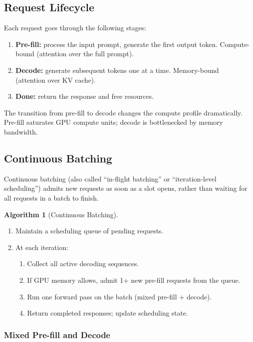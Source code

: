 \documentclass[11pt,a4paper]{article}
\theoremstyle{definition}
\newtheorem{algorithm}{Algorithm}[section]
\begin{document}
\subsection{Request Lifecycle}

Each request goes through the following stages:

\begin{enumerate}
	\item \textbf{Pre-fill:} process the input prompt, generate the first output token. Compute-bound (attention over the full prompt).
	\item \textbf{Decode:} generate subsequent tokens one at a time. Memory-bound (attention over KV cache).
	\item \textbf{Done:} return the response and free resources.
\end{enumerate}

The transition from pre-fill to decode changes the compute profile dramatically. Pre-fill saturates GPU compute units; decode is bottlenecked by memory bandwidth.

\subsection{Continuous Batching}

Continuous batching (also called ``in-flight batching'' or ``iteration-level scheduling'') admits new requests as soon as a slot opens, rather than waiting for all requests in a batch to finish.

\begin{algorithm}[Continuous Batching]
	\begin{enumerate}
		\item Maintain a scheduling queue of pending requests.
		\item At each iteration:
		      \begin{enumerate}
			      \item Collect all active decoding sequences.
			      \item If GPU memory allows, admit 1+ new pre-fill requests from the queue.
			      \item Run one forward pass on the batch (mixed pre-fill + decode).
			      \item Return completed responses; update scheduling state.
		      \end{enumerate}
	\end{enumerate}
\end{algorithm}

\subsubsection{Mixed Pre-fill and Decode}
\end{document}
